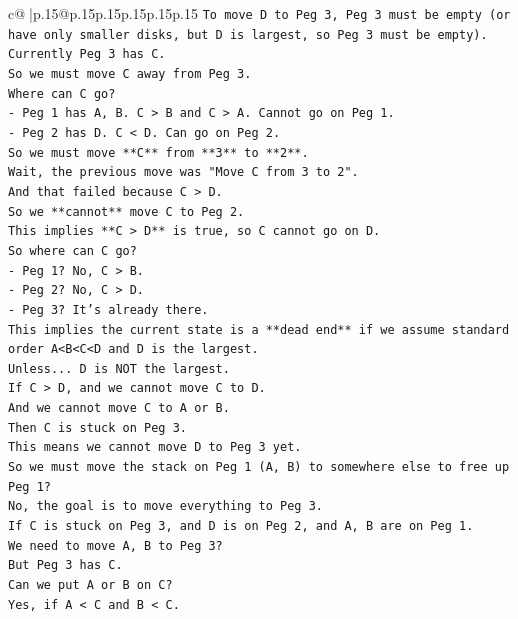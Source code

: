 \documentclass{article}
\begin{document}
{\begin{supertabular}{c@{$\;$}|p{.15\linewidth}@{}p{.15\linewidth}p{.15\linewidth}p{.15\linewidth}p{.15\linewidth}p{.15\linewidth}}
{{{\texttt{To move D to Peg 3, Peg 3 must be empty (or have only smaller disks, but D is largest, so Peg 3 must be empty).} \\
\texttt{Currently Peg 3 has C.} \\
\texttt{So we must move C away from Peg 3.} \\
\texttt{Where can C go?} \\
\texttt{{-} Peg 1 has A, B. C > B and C > A. Cannot go on Peg 1.} \\
\texttt{{-} Peg 2 has D. C < D. Can go on Peg 2.} \\
\texttt{So we must move **C** from **3** to **2**.} \\
\texttt{Wait, the previous move was "Move C from 3 to 2".} \\
\texttt{And that failed because C > D.} \\
\texttt{So we **cannot** move C to Peg 2.} \\
\texttt{This implies **C > D** is true, so C cannot go on D.} \\
\texttt{So where can C go?} \\
\texttt{{-} Peg 1? No, C > B.} \\
\texttt{{-} Peg 2? No, C > D.} \\
\texttt{{-} Peg 3? It's already there.} \\
\texttt{This implies the current state is a **dead end** if we assume standard order A<B<C<D and D is the largest.} \\
\texttt{Unless... D is NOT the largest.} \\
\texttt{If C > D, and we cannot move C to D.} \\
\texttt{And we cannot move C to A or B.} \\
\texttt{Then C is stuck on Peg 3.} \\
\texttt{This means we cannot move D to Peg 3 yet.} \\
\texttt{So we must move the stack on Peg 1 (A, B) to somewhere else to free up Peg 1?} \\
\texttt{No, the goal is to move everything to Peg 3.} \\
\texttt{If C is stuck on Peg 3, and D is on Peg 2, and A, B are on Peg 1.} \\
\texttt{We need to move A, B to Peg 3?} \\
\texttt{But Peg 3 has C.} \\
\texttt{Can we put A or B on C?} \\
\texttt{Yes, if A < C and B < C.} \\
}}}
\end{supertabular}}
\end{document}
